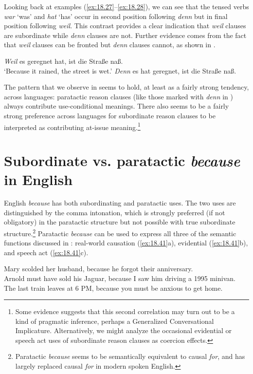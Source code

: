 Looking back at examples (\ref{ex:18.27}--\ref{ex:18.28}), we can see that the tensed verbs \textit{war} ‘was’ and \textit{hat} ‘has’ occur in second position following \textit{denn} but in final position following \textit{weil}. This contrast provides a clear indication that \textit{weil} clauses are subordinate while \textit{denn} clauses are not. Further evidence comes from the fact that \textit{weil} clauses can be fronted but \textit{denn} clauses cannot, as shown in . 

\largerpage
\ea \label{ex:18.32}
\ea  \textit{Weil} es geregnet hat, ist die Straße naß.\\
\glt ‘Because it rained, the street is wet.’
\ex *\textit{Denn} es hat geregnet, ist die Straße naß.\\
\z \z


The pattern that we observe in  seems to hold, at least as a fairly strong tendency, across languages: paratactic reason clauses (like those marked with \textit{denn} in ) always contribute use-conditional meanings. There also seems to be a fairly strong preference across languages for subordinate reason clauses to be interpreted as contributing at-issue meaning.\footnote{Some evidence suggests that this second correlation may turn out to be a kind of pragmatic inference, perhaps a Generalized Conversational Implicature. Alternatively, we might analyze the occasional evidential or speech act uses of subordinate reason clauses as coercion effects.}



\section{Subordinate vs. paratactic \textit{because} in English}\label{sec:18.4}


English \textit{because} has both subordinating and paratactic uses. The two uses are distinguished by the comma intonation, which is strongly preferred (if not obligatory) in the paratactic structure but not possible with true subordinate structure.\footnote{Paratactic \textit{because} seems to be semantically equivalent to causal \textit{for}, and has largely replaced causal \textit{for} in modern spoken English.}  Paratactic \textit{because} can be used to express all three of the semantic functions discussed in : real-world causation (\ref{ex:18.41}a), evidential (\ref{ex:18.41}b), and speech act (\ref{ex:18.41}c).


\ea \label{ex:18.41}
\ea  Mary scolded her husband, because he forgot their anniversary.\\
\ex Arnold must have sold his Jaguar, because I saw him driving a 1995 minivan.\\
\ex The last train leaves at 6 PM, because you must be anxious to get home.
                       \z
\z


